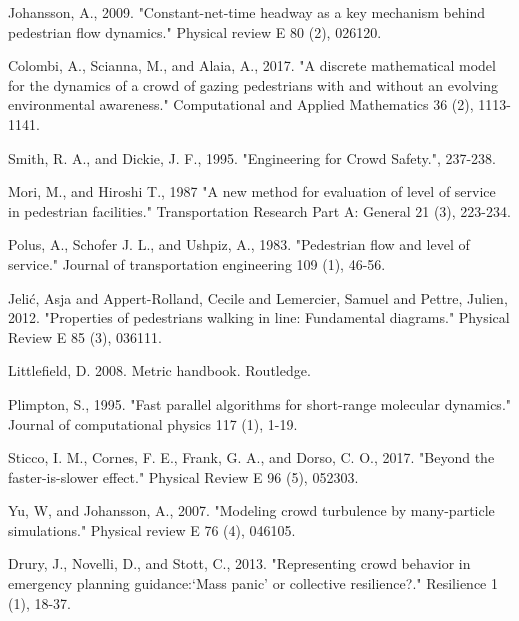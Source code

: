 \documentclass[preprint,12pt]{elsarticle}
\begin{document}
\begin{thebibliography}{10}
Johansson, A., 2009. "Constant-net-time headway as a key mechanism behind 
pedestrian flow dynamics." Physical review E 80 (2), 026120. 
{}

Colombi, A., Scianna, M., and Alaia, A., 2017. "A discrete 
mathematical model for the dynamics of a crowd of gazing pedestrians with and 
without an evolving environmental awareness." Computational and Applied 
Mathematics 36 (2), 1113-1141.
{}

Smith, R. A., and Dickie, J. F., 1995. "Engineering for Crowd Safety.", 237-238.

Mori, M., and Hiroshi T., 1987 "A new method for evaluation of level of 
service in pedestrian facilities." Transportation Research Part A: General 
21 (3), 223-234.
{}

Polus, A., Schofer J. L., and Ushpiz, A., 1983. "Pedestrian flow and level 
of service." Journal of transportation engineering 109 (1), 46-56.
{}

Jeli\'c, Asja and Appert-Rolland, Cecile and Lemercier, Samuel and Pettre, 
Julien, 2012. "Properties of pedestrians walking in line: Fundamental 
diagrams." Physical Review E 85 (3), 036111.
{}

Littlefield, D. 2008. Metric handbook. Routledge.
{}


Plimpton, S., 1995. "Fast parallel algorithms for short-range molecular 
dynamics." Journal of computational physics 117 (1), 1-19.
{}

Sticco, I. M., Cornes, F. E., Frank, G. A., and Dorso, C. O., 2017. "Beyond the 
faster-is-slower effect." Physical Review E 96 (5), 052303.
{}

Yu, W, and Johansson, A., 2007. "Modeling crowd turbulence by many-particle 
simulations." Physical review E 76 (4), 046105.
{}

Drury, J., Novelli, D., and Stott, C., 2013. "Representing crowd behavior in 
emergency planning guidance:‘Mass panic’ or collective resilience?." Resilience 
1 (1), 18-37.
{}


\end{thebibliography}
\end{document}
